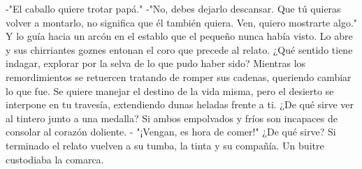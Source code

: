 {}-"El caballo quiere trotar papá." -"No, debes dejarlo descansar. Que tú quieras volver a montarlo, no significa que él también quiera. Ven, quiero mostrarte algo." Y lo guía hacia un arcón en el establo que el pequeño nunca había visto. Lo abre y sus chirriantes goznes entonan el coro que precede al relato. ¿Qué sentido tiene indagar, explorar por la selva de lo que pudo haber sido? Mientras los remordimientos se retuercen tratando de romper sus cadenas, queriendo cambiar lo que fue. Se quiere manejar el destino de la vida misma, pero el desierto se interpone en tu travesía, extendiendo dunas heladas frente a ti. ¿De qué sirve ver al tintero junto a una medalla? Si ambos empolvados y fríos son incapaces de consolar al corazón doliente. - "¡Vengan, es hora de comer!" ¿De qué sirve? Si terminado el relato vuelven a su tumba, la tinta y su compañía.\markdownRendererInterblockSeparator
{}Un buitre custodiaba la comarca.\relax
